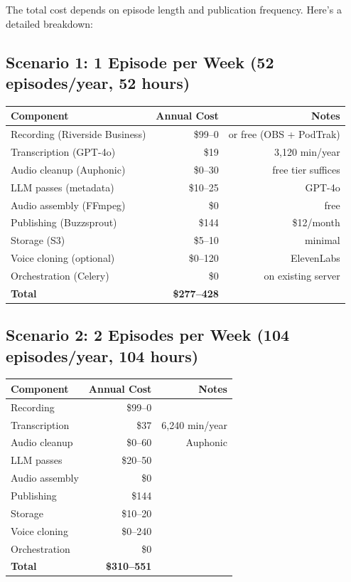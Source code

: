 \documentclass[11pt,letterpaper]{article}
\begin{document}
The total cost depends on episode length and publication frequency. Here's a detailed breakdown:

\subsection{Scenario 1: 1 Episode per Week (52 episodes/year, 52 hours)}

\begin{center}
\begin{tabular}{lrr}
\toprule
\textbf{Component} & \textbf{Annual Cost} & \textbf{Notes} \\
\midrule
Recording (Riverside Business) & \$99–0 & or free (OBS + PodTrak) \\
Transcription (GPT-4o) & \$19 & 3,120 min/year \\
Audio cleanup (Auphonic) & \$0–30 & free tier suffices \\
LLM passes (metadata) & \$10–25 & GPT-4o \\
Audio assembly (FFmpeg) & \$0 & free \\
Publishing (Buzzsprout) & \$144 & \$12/month \\
Storage (S3) & \$5–10 & minimal \\
Voice cloning (optional) & \$0–120 & ElevenLabs \\
Orchestration (Celery) & \$0 & on existing server \\
\midrule
\textbf{Total} & \textbf{\$277–428} & \\
\bottomrule
\end{tabular}
\end{center}

\subsection{Scenario 2: 2 Episodes per Week (104 episodes/year, 104 hours)}

\begin{center}
\begin{tabular}{lrr}
\toprule
\textbf{Component} & \textbf{Annual Cost} & \textbf{Notes} \\
\midrule
Recording & \$99–0 & \\
Transcription & \$37 & 6,240 min/year \\
Audio cleanup & \$0–60 & Auphonic \\
LLM passes & \$20–50 & \\
Audio assembly & \$0 & \\
Publishing & \$144 & \\
Storage & \$10–20 & \\
Voice cloning & \$0–240 & \\
Orchestration & \$0 & \\
\midrule
\textbf{Total} & \textbf{\$310–551} & \\
\bottomrule
\end{tabular}
\end{center}
\end{document}
